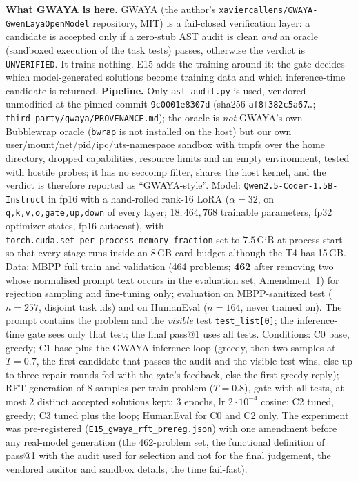 \documentclass[11pt,a4paper]{article}
\begin{document}
\textbf{What GWAYA is here.} GWAYA (the author's \texttt{xaviercallens/GWAYA-GwenLayaOpenModel} repository, MIT) is a fail-closed verification layer: a candidate is accepted only if a zero-stub AST audit is clean \emph{and} an oracle (sandboxed execution of the task tests) passes, otherwise the verdict is \texttt{UNVERIFIED}. It trains nothing. E15 adds the training around it: the gate decides which model-generated solutions become training data and which inference-time candidate is returned. \textbf{Pipeline.} Only \texttt{ast\_audit.py} is used, vendored unmodified at the pinned commit \texttt{9c0001e8307d} (sha256 \texttt{af8f382c5a67\ldots}; \texttt{third\_party/gwaya/PROVENANCE.md}); the oracle is \emph{not} GWAYA's own Bubblewrap oracle (\texttt{bwrap} is not installed on the host) but our own user/mount/net/pid/ipc/uts-namespace sandbox with tmpfs over the home directory, dropped capabilities, resource limits and an empty environment, tested with hostile probes; it has no seccomp filter, shares the host kernel, and the verdict is therefore reported as ``GWAYA-style''. Model: \texttt{Qwen2.5-Coder-1.5B-Instruct} in fp16 with a hand-rolled rank-16 LoRA ($\alpha=32$, on \texttt{q,k,v,o,gate,up,down} of every layer; $18{,}464{,}768$ trainable parameters, fp32 optimizer states, fp16 autocast), with \texttt{torch.cuda.set\_per\_process\_memory\_fraction} set to $7.5$\,GiB at process start so that every stage runs inside an 8\,GB card budget although the T4 has 15\,GB. Data: MBPP full train and validation (464 problems; \textbf{462} after removing two whose normalised prompt text occurs in the evaluation set, Amendment~1) for rejection sampling and fine-tuning only; evaluation on MBPP-sanitized test ($n=257$, disjoint task ids) and on HumanEval ($n=164$, never trained on). The prompt contains the problem and the \emph{visible} test \texttt{test\_list[0]}; the inference-time gate sees only that test; the final pass@1 uses all tests. Conditions: C0 base, greedy; C1 base plus the GWAYA inference loop (greedy, then two samples at $T=0.7$, the first candidate that passes the audit and the visible test wins, else up to three repair rounds fed with the gate's feedback, else the first greedy reply); RFT generation of 8 samples per train problem ($T=0.8$), gate with all tests, at most 2 distinct accepted solutions kept; 3 epochs, lr $2\cdot10^{-4}$ cosine; C2 tuned, greedy; C3 tuned plus the loop; HumanEval for C0 and C2 only. The experiment was pre-registered (\texttt{E15\_gwaya\_rft\_prereg.json}) with one amendment before any real-model generation (the 462-problem set, the functional definition of pass@1 with the audit used for selection and not for the final judgement, the vendored auditor and sandbox details, the time fail-fast).
\end{document}
